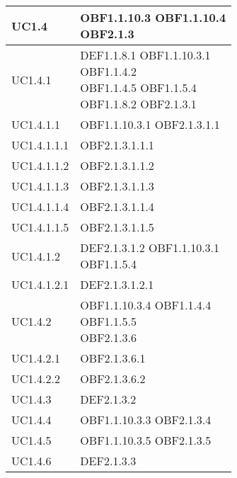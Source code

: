 \documentclass{scalatekids-article}
\begin{document}
\begin{longtable}[H]{|p{5.5cm}|p{5.5cm}|}
\hline
UC1.4 & \multiLineCell[t]{OBF1.1.10.3 OBF1.1.10.4\\OBF2.1.3}\\
\hline
UC1.4.1 & \multiLineCell[t]{DEF1.1.8.1 OBF1.1.10.3.1\\OBF1.1.4.2\\OBF1.1.4.5 OBF1.1.5.4\\OBF1.1.8.2 OBF2.1.3.1\\}\\
\hline
UC1.4.1.1 & \multiLineCell[t]{OBF1.1.10.3.1 OBF2.1.3.1.1\\}\\
\hline
UC1.4.1.1.1 & \multiLineCell[t]{OBF2.1.3.1.1.1\\}\\
\hline
UC1.4.1.1.2 & \multiLineCell[t]{OBF2.1.3.1.1.2\\}\\
\hline
UC1.4.1.1.3 & \multiLineCell[t]{OBF2.1.3.1.1.3\\}\\
\hline
UC1.4.1.1.4 & \multiLineCell[t]{OBF2.1.3.1.1.4\\}\\
\hline
UC1.4.1.1.5 & \multiLineCell[t]{OBF2.1.3.1.1.5\\}\\
\hline
UC1.4.1.2 & \multiLineCell[t]{DEF2.1.3.1.2 OBF1.1.10.3.1\\OBF1.1.5.4}\\
\hline
UC1.4.1.2.1 & \multiLineCell[t]{DEF2.1.3.1.2.1\\}\\
\hline
UC1.4.2 & \multiLineCell[t]{OBF1.1.10.3.4 OBF1.1.4.4\\OBF1.1.5.5\\OBF2.1.3.6}\\
\hline
UC1.4.2.1 & \multiLineCell[t]{OBF2.1.3.6.1\\}\\
\hline
UC1.4.2.2 & \multiLineCell[t]{OBF2.1.3.6.2\\}\\
\hline
UC1.4.3 & \multiLineCell[t]{DEF2.1.3.2\\}\\
\hline
UC1.4.4 & \multiLineCell[t]{OBF1.1.10.3.3 OBF2.1.3.4\\}\\
\hline
UC1.4.5 & \multiLineCell[t]{OBF1.1.10.3.5 OBF2.1.3.5\\}\\
\hline
UC1.4.6 & \multiLineCell[t]{DEF2.1.3.3\\}\\

\end{longtable}
\end{document}
